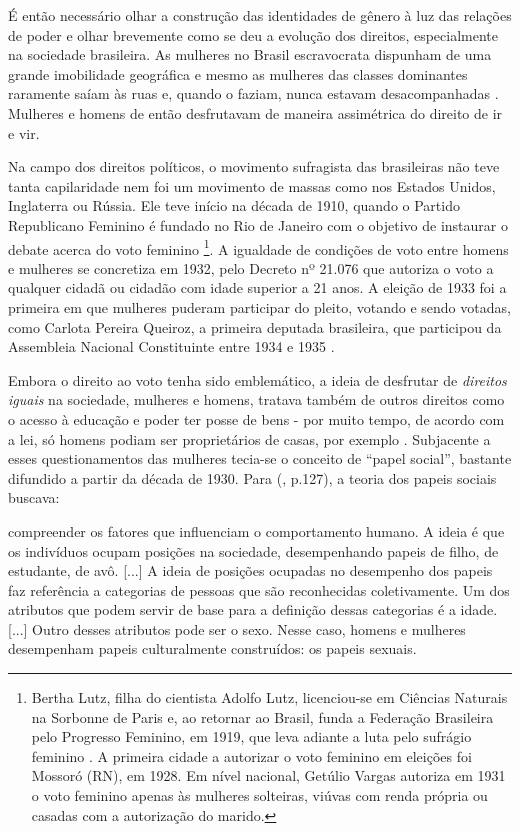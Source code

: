 É então necessário olhar a construção das identidades de gênero à luz das relações de poder e olhar brevemente como se deu a evolução dos direitos, especialmente na sociedade brasileira. As mulheres no Brasil escravocrata dispunham de uma grande imobilidade geográfica e mesmo as mulheres das classes dominantes raramente saíam às ruas e, quando o faziam, nunca estavam desacompanhadas \cite{SAFFIOTI2013}. Mulheres e homens de então desfrutavam de maneira assimétrica do direito de ir e vir.

Na campo dos direitos políticos, o movimento sufragista das brasileiras não teve tanta capilaridade nem foi um movimento de massas como nos Estados Unidos, Inglaterra ou Rússia. Ele teve início na década de 1910, quando o Partido Republicano Feminino é fundado no Rio de Janeiro com o objetivo de instaurar o debate acerca do voto feminino 
\footnote{
Bertha Lutz, filha do cientista Adolfo Lutz, licenciou-se em Ciências Naturais na Sorbonne de Paris e, ao retornar ao Brasil, funda a Federação Brasileira pelo Progresso Feminino, em 1919, que leva adiante a luta pelo sufrágio feminino \cite{PINSKY2003}. A primeira cidade a autorizar o voto feminino em eleições foi Mossoró (RN), em 1928. Em nível nacional, Getúlio Vargas autoriza em 1931 o voto feminino apenas às mulheres solteiras, viúvas com renda própria ou casadas com a autorização do marido.}.
A igualdade de condições de voto entre homens e mulheres se concretiza em 1932, pelo Decreto nº 21.076 que autoriza o voto a qualquer cidadã ou cidadão com idade superior a 21 anos. A eleição de 1933 foi a primeira em que mulheres puderam participar do pleito, votando e sendo votadas, como Carlota Pereira Queiroz, a primeira deputada brasileira, que participou da Assembleia Nacional Constituinte entre 1934 e 1935 \cite{TABAK1989}.

Embora o direito ao voto tenha sido emblemático, a ideia de desfrutar de \emph{direitos iguais} na sociedade, mulheres e homens, tratava também de outros direitos como o acesso à educação e poder ter posse de bens - por muito tempo, de acordo com a lei, só homens podiam ser proprietários de casas, por exemplo \cite{PISCITELLI2009}. Subjacente a esses questionamentos das mulheres tecia-se o conceito de ``papel social'', bastante difundido a partir da década de 1930. Para  (\citeyear{PISCITELLI2009}, p.127), a teoria dos papeis sociais buscava:

\begin{citacao}
compreender os fatores que influenciam o comportamento humano. A ideia é que os indivíduos ocupam posições na sociedade, desempenhando papeis de filho, de estudante, de avô. [...] A ideia de posições ocupadas no desempenho dos papeis faz referência a categorias de pessoas que são reconhecidas coletivamente. Um dos atributos que podem servir de base para a definição dessas categorias é a idade. [...] Outro desses atributos pode ser o sexo. Nesse caso, homens e mulheres desempenham papeis culturalmente construídos: os papeis sexuais.
\end{citacao}


